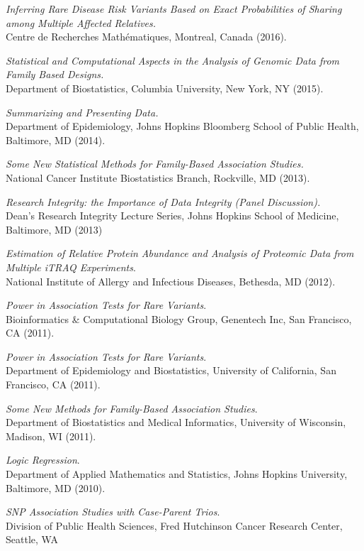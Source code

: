 \documentclass[10pt]{article}
\newcommand{\dn}[1]{{\color{black} {#1}}}
\begin{document}
\item
{\it Inferring Rare Disease Risk Variants Based on Exact Probabilities of Sharing among Multiple Affected Relatives.}\\
Centre de Recherches Math\'ematiques, \dn{Montreal, Canada}
(2016).
\item
{\it Statistical and Computational Aspects in the Analysis of Genomic Data from Family Based Designs.}\\
Department of Biostatistics, Columbia University, New York, NY
(2015).
\item
{\it Summarizing and Presenting Data.}\\
Department of Epidemiology, Johns Hopkins Bloomberg School of Public Health, Baltimore, MD
(2014).
\item
{\it Some New Statistical Methods for Family-Based Association Studies.}\\
National Cancer Institute Biostatistics Branch, Rockville, MD
(2013).
\item
{\it Research Integrity: the Importance of Data Integrity (Panel Discussion).}\\
Dean’s Research Integrity Lecture Series, Johns Hopkins School of Medicine, Baltimore, MD
(2013)
\item
{\it Estimation of Relative Protein Abundance and Analysis of Proteomic Data from Multiple iTRAQ Experiments}.\\
National Institute of Allergy and Infectious Diseases, Bethesda, MD
(2012).
\item
{\it Power in Association Tests for Rare Variants}.\\
Bioinformatics \& Computational Biology Group, Genentech Inc, San Francisco, CA
(2011). 
\item
{\it Power in Association Tests for Rare Variants}.\\
Department of Epidemiology and Biostatistics, University of California, San Francisco, CA
(2011). 
\item
{\it Some New Methods for Family-Based Association Studies}.\\
Department of Biostatistics and Medical Informatics, University of Wisconsin, Madison, WI
(2011).
\item
{\it Logic Regression}.\\
Department of Applied Mathematics and Statistics, Johns Hopkins University, Baltimore, MD
(2010).
\item
{\it SNP Association Studies with Case-Parent Trios}.\\
Division of Public Health Sciences, Fred Hutchinson Cancer Research Center, Seattle, WA
\end{document}
